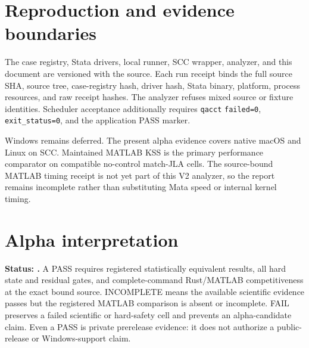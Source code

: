 \documentclass[11pt]{article}
\begin{document}
\section{Reproduction and evidence boundaries}

The case registry, Stata drivers, local runner, SCC wrapper, analyzer, and this
document are versioned with the source.  Each run receipt binds the full source
SHA, source tree, case-registry hash, driver hash, Stata binary, platform,
process resources, and raw receipt hashes.  The analyzer refuses mixed source
or fixture identities.  Scheduler acceptance additionally requires
\texttt{qacct} \texttt{failed=0}, \texttt{exit\_status=0}, and the
application PASS marker.

Windows remains deferred.  The present alpha evidence covers native macOS and
Linux on SCC.  Maintained MATLAB KSS is the primary performance comparator on
compatible no-control match-JLA cells.  The source-bound MATLAB timing receipt
is not yet part of this V2 analyzer, so the report remains incomplete rather
than substituting Mata speed or internal kernel timing.

\section{Alpha interpretation}

\textbf{Status: \AlphaStatus.}  A PASS requires registered statistically
equivalent results, all hard state and residual gates, and complete-command
Rust/MATLAB competitiveness at the exact bound source.  INCOMPLETE means the
available scientific evidence passes but the registered MATLAB comparison is
absent or incomplete.  FAIL preserves a failed scientific or hard-safety cell
and prevents an alpha-candidate claim.  Even a PASS is private prerelease
evidence: it does not authorize a public-release or Windows-support claim.
\end{document}
